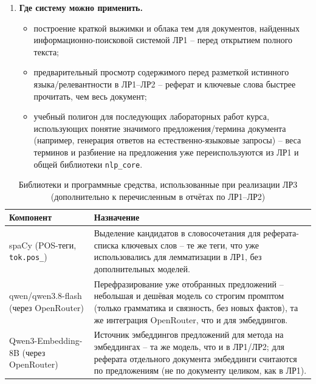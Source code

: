\begin{enumerate}
\begin{itemize}
    \item параллельные запросы эмбеддингов предложений вместо
    последовательных -- основная причина отставания метода на
    эмбеддингах по скорости, ограничение сейчас только на стороне
    клиента nlp-service.
  \end{itemize}
  \item \textbf{Где систему можно применить.}
  \begin{itemize}
    \item построение краткой выжимки и облака тем для документов,
    найденных информационно-поисковой системой ЛР1 -- перед открытием
    полного текста;
    \item предварительный просмотр содержимого перед разметкой
    истинного языка/релевантности в ЛР1--ЛР2 -- реферат и ключевые
    слова быстрее прочитать, чем весь документ;
    \item учебный полигон для последующих лабораторных работ курса,
    использующих понятие значимого предложения/термина документа
    (например, генерация ответов на естественно-языковые запросы) --
    веса терминов и разбиение на предложения уже переиспользуются из
    ЛР1 и общей библиотеки \texttt{nlp\_core}.
  \end{itemize}
\end{enumerate}


\begin{table}[H]
  \centering
  \caption{Библиотеки и программные средства, использованные при реализации ЛР3 (дополнительно к перечисленным в отчётах по ЛР1--ЛР2)}
  \label{tab:stack-summarization}
  \small
  \begin{tabularx}{\textwidth}{|l|X|}
    \hline
    Компонент & Назначение \\
    \hline
    spaCy (POS-теги, \texttt{tok.pos\_}) & Выделение кандидатов в
      словосочетания для реферата-списка ключевых слов -- те же
      теги, что уже использовались для лемматизации в ЛР1, без
      дополнительных моделей. \\
    \hline
    qwen/qwen3.8-flash (через OpenRouter) & Перефразирование
      уже отобранных предложений -- небольшая и дешёвая модель со
      строгим промптом (только грамматика и связность, без новых
      фактов), та же интеграция OpenRouter, что и для эмбеддингов. \\
    \hline
    Qwen3-Embedding-8B (через OpenRouter) & Источник эмбеддингов
      предложений для метода на эмбеддингах -- та же модель, что и в
      ЛР1/ЛР2; для реферата отдельного документа эмбеддинги считаются
      по предложениям (не по документу целиком, как в ЛР1). \\
    \hline
  \end{tabularx}
\end{table}
